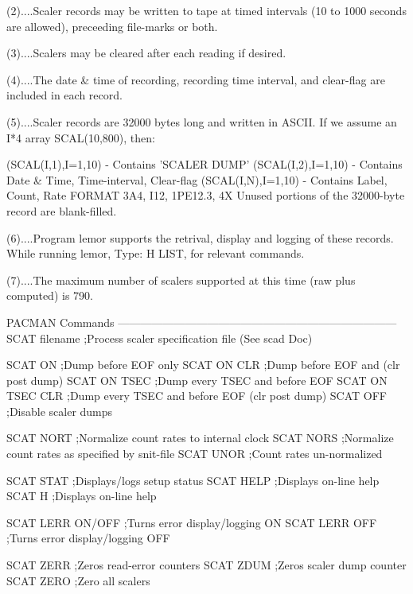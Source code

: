    (2)....Scaler  records  may  be  written  to tape at timed intervals (10 to
          1000 seconds are allowed), preceeding file-marks or both.
 
   (3)....Scalers may be cleared after each reading if desired.
 
   (4)....The   date  &  time  of  recording,  recording  time  interval,  and
          clear-flag are included in each record.
 
   (5)....Scaler records are 32000 bytes long and  written  in  ASCII.  If  we
          assume an I*4 array SCAL(10,800), then:
 
          (SCAL(I,1),I=1,10) - Contains 'SCALER DUMP'
          (SCAL(I,2),I=1,10) - Contains Date & Time, Time-interval, Clear-flag
          (SCAL(I,N),I=1,10) - Contains Label, Count, Rate
                               FORMAT   3A4,   I12,   1PE12.3, 4X
          Unused portions of the 32000-byte record are blank-filled.
 
   (6)....Program  lemor  supports  the retrival, display and logging of these
          records. While running lemor, Type: H LIST, for relevant commands.
 
   (7)....The maximum number of scalers  supported  at  this  time  (raw  plus
          computed) is 790.
 
   PACMAN Commands
   ---------------------------------------------------------------------------
   SCAT  filename         ;Process scaler specification file (See scad Doc)
 
   SCAT  ON               ;Dump before EOF only
   SCAT  ON  CLR          ;Dump before EOF and (clr post dump)
   SCAT  ON  TSEC         ;Dump every TSEC and before EOF
   SCAT  ON  TSEC  CLR    ;Dump every TSEC and before EOF (clr post dump)
   SCAT  OFF              ;Disable scaler dumps
 
   SCAT  NORT             ;Normalize count rates to internal clock
   SCAT  NORS             ;Normalize count rates as specified by snit-file
   SCAT  UNOR             ;Count rates un-normalized
 
   SCAT  STAT             ;Displays/logs setup status
   SCAT  HELP             ;Displays on-line help
   SCAT  H                ;Displays on-line help
 
   SCAT  LERR ON/OFF      ;Turns error display/logging ON
   SCAT  LERR OFF         ;Turns error display/logging OFF
 
   SCAT  ZERR             ;Zeros read-error  counters
   SCAT  ZDUM             ;Zeros scaler dump counter
   SCAT  ZERO             ;Zero all scalers
 
